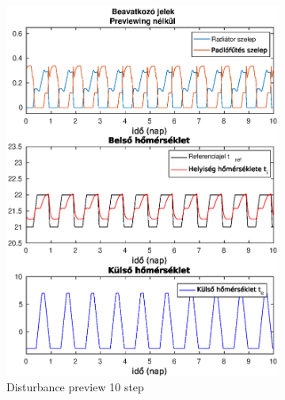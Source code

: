 \begin{figure}[H]
\begin{subfigure}[t]{0.32\textwidth}
		\includegraphics[trim=0 0 0 27, clip,width=\textwidth]{figures/onlab/compare/A_C_P0D10}
		\caption{Disturbance preview 10 step}
		\label{fig:mpc-pr0d10}
	\end{subfigure}
	~
	\begin{subfigure}[t]{0.32\textwidth}
		\centering

\end{subfigure}
\end{figure}
